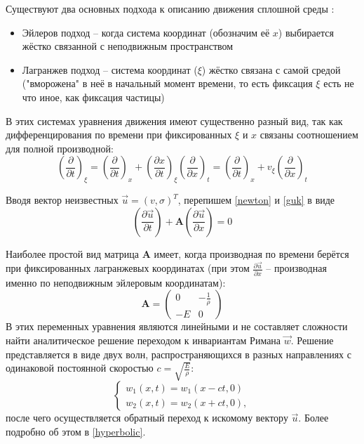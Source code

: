 Существуют два основных подхода к описанию движения сплошной среды \cite{sedov}:
\begin{itemize}
\item Эйлеров подход -- когда система координат (обозначим её $x$) выбирается жёстко связанной с неподвижным пространством
\item Лагранжев подход -- система координат ($\xi$) жёстко связана с самой средой ("вморожена" в неё в начальный момент времени, то есть фиксация $\xi$ есть не что иное, как фиксация частицы)
\end{itemize}
В этих системах уравнения движения имеют существенно разный вид, так как дифференцирования по времени при фиксированных $\xi$ и $x$ связаны соотношением для полной производной:
\begin{equation}
\left(\frac{\partial}{\partial t}\right)_{\xi} = \left(\frac{\partial}{\partial t}\right)_{x} + 
\left(\frac{\partial x}{\partial t}\right)_{\xi}\left(\frac{\partial}{\partial x}\right)_{t} =  \left(\frac{\partial}{\partial t}\right)_{x} + v_{\xi}\left(\frac{\partial}{\partial x}\right)_{t}
\end{equation}

Вводя вектор неизвестных $\vec{u} = (v, \sigma)^T$, перепишем \ref{newton} и \ref{guk} в виде
\begin{equation}
\left( \frac{\partial \vec{u}}{\partial t} \right) + \mathbf{A}\left( \frac{\partial \vec{u}}{\partial x} \right) = 0
\end{equation}

Наиболее простой вид матрица $\mathbf{A}$ имеет, когда производная по времени берётся при фиксированных  лагранжевых координатах (при этом $\frac{\partial \vec{u}}{\partial x}$ -- производная именно по неподвижным эйлеровым координатам):
\begin{displaymath}
\mathbf{A} =
\left( \begin{array}{cc}
0 & -\frac{1}{\rho} \\
-E & 0
\end{array} \right)
\end{displaymath}
В этих переменных уравнения являются линейными и не составляет сложности найти аналитическое решение переходом к инвариантам Римана $\vec{w}$\cite{vasyukov}. Решение представляется в виде двух волн, распространяющихся в разных направлениях с одинаковой постоянной скоростью $c = \sqrt{\frac{E}{\rho}}$:
\begin{equation}
\left\lbrace
\begin{array}{cc}
w_1(x,t) = w_1(x - ct,0)  \\
w_2(x,t) = w_2(x + ct,0),
\end{array}
\right.
\end{equation}
после чего осуществляется обратный переход к искомому вектору $\vec{u}$. Более подробно об этом в \ref{hyperbolic}.

